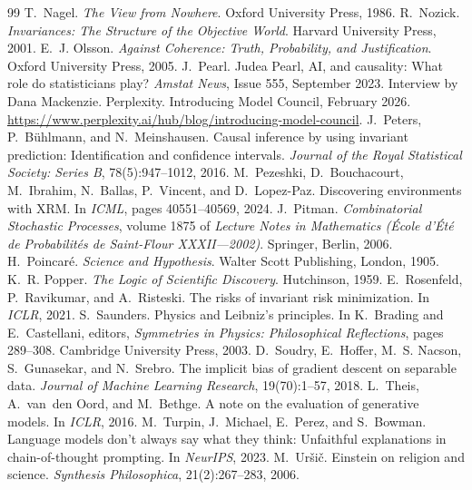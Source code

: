 \documentclass[11pt,a4paper]{article}
\theoremstyle{definition}
\theoremstyle{remark}
\begin{document}
\begin{thebibliography}{99}
 T.~Nagel. \emph{The View from Nowhere}. Oxford University Press, 1986.
 R.~Nozick. \emph{Invariances: The Structure of the Objective World}. Harvard University Press, 2001.
 E.~J. Olsson. \emph{Against Coherence: Truth, Probability, and Justification}. Oxford University Press, 2005.
 J.~Pearl. {J}udea {P}earl, {AI}, and causality: What role do statisticians play? \emph{Amstat News}, Issue 555, September 2023. Interview by Dana Mackenzie.
 Perplexity. Introducing {M}odel {C}ouncil, February 2026. \url{https://www.perplexity.ai/hub/blog/introducing-model-council}.
 J.~Peters, P.~B\"uhlmann, and N.~Meinshausen. Causal inference by using invariant prediction: Identification and confidence intervals. \emph{Journal of the Royal Statistical Society: Series B}, 78(5):947--1012, 2016.
 M.~Pezeshki, D.~Bouchacourt, M.~Ibrahim, N.~Ballas, P.~Vincent, and D.~Lopez-Paz. Discovering environments with {XRM}. In \emph{ICML}, pages 40551--40569, 2024.
 J.~Pitman. \emph{Combinatorial Stochastic Processes}, volume 1875 of \emph{Lecture Notes in Mathematics (\'Ecole d'\'Et\'e de Probabilit\'es de Saint-Flour XXXII---2002)}. Springer, Berlin, 2006.
 H.~Poincar\'e. \emph{Science and Hypothesis}. Walter Scott Publishing, London, 1905.
 K.~R. Popper. \emph{The Logic of Scientific Discovery}. Hutchinson, 1959.
 E.~Rosenfeld, P.~Ravikumar, and A.~Risteski. The risks of invariant risk minimization. In \emph{ICLR}, 2021.
 S.~Saunders. Physics and {L}eibniz's principles. In K.~Brading and E.~Castellani, editors, \emph{Symmetries in Physics: Philosophical Reflections}, pages 289--308. Cambridge University Press, 2003.
 D.~Soudry, E.~Hoffer, M.~S. Nacson, S.~Gunasekar, and N.~Srebro. The implicit bias of gradient descent on separable data. \emph{Journal of Machine Learning Research}, 19(70):1--57, 2018.
 L.~Theis, A.~van~den Oord, and M.~Bethge. A note on the evaluation of generative models. In \emph{ICLR}, 2016.
 M.~Turpin, J.~Michael, E.~Perez, and S.~Bowman. Language models don't always say what they think: Unfaithful explanations in chain-of-thought prompting. In \emph{NeurIPS}, 2023.
 M.~Ur\v{s}i\v{c}. Einstein on religion and science. \emph{Synthesis Philosophica}, 21(2):267--283, 2006.

\end{thebibliography}
\end{document}
